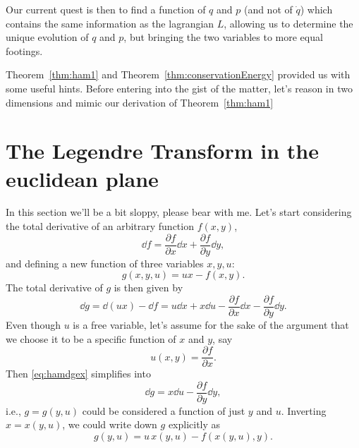 \documentclass[english,fontsize=11pt,paper=b5]{scrbook}
\theoremstyle{definition}
\begin{document}
    Our current quest is then to find a function of $q$ and $p$ (and not of $\dot q$) which contains the same information as the lagrangian $L$, allowing us to determine the unique evolution of $q$ and $p$, but bringing the two variables to more equal footings.

    Theorem~\ref{thm:ham1} and Theorem~\ref{thm:conservationEnergy} provided us with some useful hints.
    Before entering into the gist of the matter, let's reason in two dimensions and mimic our derivation of Theorem~\ref{thm:ham1}

    \section{The Legendre Transform in the euclidean plane}

    In this section we'll be a bit sloppy, please bear with me.
    Let's start considering the total derivative of an arbitrary function $f(x,y)$,
    \begin{equation}
      \dd f = \frac{\partial f}{\partial x} \dd x + \frac{\partial f}{\partial y} \dd y,
    \end{equation}
    and defining a new function of three variables $x,y,u$:
    \begin{equation}
      g(x,y,u) = ux - f(x,y).
    \end{equation}
    The total derivative of $g$ is then given by
    \begin{equation}\label{eq:hamdgex}
      \dd g = \dd(ux) - \dd f = u\dd x + x \dd u - \frac{\partial f}{\partial x} \dd x - \frac{\partial f}{\partial y} \dd y.
    \end{equation}
    Even though $u$ is a free variable, let's assume for the sake of the argument that we choose it to be a specific function of $x$  and $y$, say
    \begin{equation}
      u(x,y) = \frac{\partial f}{\partial x}.
    \end{equation}
    Then \eqref{eq:hamdgex} simplifies into
    \begin{equation}
      \dd g = x \dd u - \frac{\partial f}{\partial y} \dd y,
    \end{equation}
    i.e., $g=g(y,u)$ could be considered a function of just $y$ and $u$.
    Inverting $x = x(y,u)$, we could write down $g$ explicitly as
    \begin{equation}
      g(y,u) = u\, x(y,u) - f(x(y, u), y).
    \end{equation}
\end{document}
